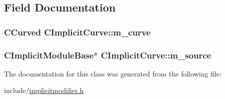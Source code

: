 \subsection{Field Documentation}
\hypertarget{classCImplicitCurve_aad05fbfe55c7ff91cdeb2a656e64949a}{
\subsubsection[{m\_\-curve}]{\setlength{\rightskip}{0pt plus 5cm}CCurved {\bf CImplicitCurve::m\_\-curve}}}
\label{classCImplicitCurve_aad05fbfe55c7ff91cdeb2a656e64949a}
\hypertarget{classCImplicitCurve_a7742f1bd9b4e09b6c852c91520cbad2e}{
\subsubsection[{m\_\-source}]{\setlength{\rightskip}{0pt plus 5cm}CImplicitModuleBase$\ast$ {\bf CImplicitCurve::m\_\-source}}}
\label{classCImplicitCurve_a7742f1bd9b4e09b6c852c91520cbad2e}


The documentation for this class was generated from the following file:\begin{DoxyCompactItemize}
\item 
include/\hyperlink{implicitmodifier_8h}{implicitmodifier.h}\end{DoxyCompactItemize}
